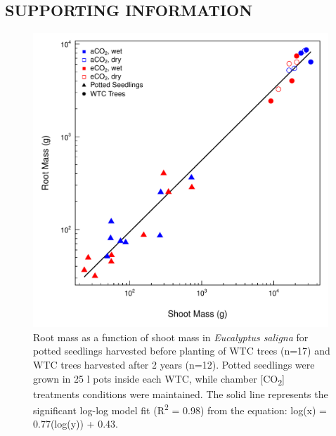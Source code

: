 \documentclass[a4paper]{article}\usepackage[]{graphicx}\usepackage[]{color}
\begin{document}
\subsection*{SUPPORTING INFORMATION}

\begin{figure}[h!]
    \centering
    \includegraphics[width=0.99\textwidth]{rootshoot.pdf}
    \caption{Root mass as a function of shoot mass in \textit{Eucalyptus saligna} for potted seedlings harvested before planting of WTC trees (n=17) and WTC trees harvested after 2 years (n=12). Potted seedlings were grown in 25 l pots inside each WTC, while chamber [CO\textsubscript{2}] treatments conditions were maintained. The solid line represents the significant log-log model fit (R\textsuperscript{2} = 0.98) from the equation: log(x) = 0.77(log(y)) + 0.43.}
    \label{fig:figure 4.S1}
\end{figure}
\end{document}
